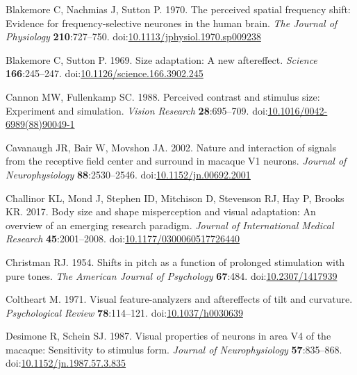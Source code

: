 \documentclass[
]{article}
\newlength{\cslhangindent}
\newlength{\cslentryspacingunit} %
\newenvironment{CSLReferences}[2] %
 {%
  \setlength{\parindent}{0pt}
  \ifodd #1
  \let\oldpar\par
  \def\par{\hangindent=\cslhangindent\oldpar}
  \fi
  \setlength{\parskip}{#2\cslentryspacingunit}
 }%
 {}
\begin{document}
\begin{CSLReferences}{1}{0}
\leavevmode{}%
Blakemore C, Nachmias J, Sutton P. 1970. The perceived spatial frequency shift: Evidence for frequency-selective neurones in the human brain. \emph{The Journal of Physiology} \textbf{210}:727--750. doi:\href{https://doi.org/10.1113/jphysiol.1970.sp009238}{10.1113/jphysiol.1970.sp009238}

\leavevmode{}%
Blakemore C, Sutton P. 1969. Size adaptation: A new aftereffect. \emph{Science} \textbf{166}:245--247. doi:\href{https://doi.org/10.1126/science.166.3902.245}{10.1126/science.166.3902.245}

\leavevmode{}%
Cannon MW, Fullenkamp SC. 1988. Perceived contrast and stimulus size: Experiment and simulation. \emph{Vision Research} \textbf{28}:695--709. doi:\href{https://doi.org/10.1016/0042-6989(88)90049-1}{10.1016/0042-6989(88)90049-1}

\leavevmode{}%
Cavanaugh JR, Bair W, Movshon JA. 2002. Nature and interaction of signals from the receptive field center and surround in macaque V1 neurons. \emph{Journal of Neurophysiology} \textbf{88}:2530--2546. doi:\href{https://doi.org/10.1152/jn.00692.2001}{10.1152/jn.00692.2001}

\leavevmode{}%
Challinor KL, Mond J, Stephen ID, Mitchison D, Stevenson RJ, Hay P, Brooks KR. 2017. Body size and shape misperception and visual adaptation: An overview of an emerging research paradigm. \emph{Journal of International Medical Research} \textbf{45}:2001--2008. doi:\href{https://doi.org/10.1177/0300060517726440}{10.1177/0300060517726440}

\leavevmode{}%
Christman RJ. 1954. Shifts in pitch as a function of prolonged stimulation with pure tones. \emph{The American Journal of Psychology} \textbf{67}:484. doi:\href{https://doi.org/10.2307/1417939}{10.2307/1417939}

\leavevmode{}%
Coltheart M. 1971. Visual feature-analyzers and aftereffects of tilt and curvature. \emph{Psychological Review} \textbf{78}:114--121. doi:\href{https://doi.org/10.1037/h0030639}{10.1037/h0030639}

\leavevmode{}%
Desimone R, Schein SJ. 1987. Visual properties of neurons in area V4 of the macaque: Sensitivity to stimulus form. \emph{Journal of Neurophysiology} \textbf{57}:835--868. doi:\href{https://doi.org/10.1152/jn.1987.57.3.835}{10.1152/jn.1987.57.3.835}


\end{CSLReferences}
\end{document}
